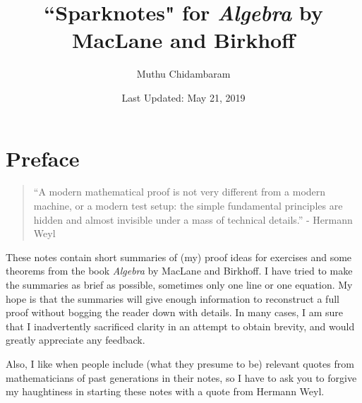 \documentclass{article}
\begin{document}
\title{``Sparknotes" for \textit{Algebra} by MacLane and Birkhoff}
\author{Muthu Chidambaram}
\date{Last Updated: May 21, 2019}

\maketitle

\tableofcontents
\newpage 

\section*{Preface}

\begin{framed}
\begin{quote}
``A modern mathematical proof is not very different from a modern machine, or a modern test setup: the simple fundamental principles are hidden and almost invisible under a mass of technical details.'' - Hermann Weyl
\end{quote}
\end{framed}

These notes contain short summaries of (my) proof ideas for exercises
and some theorems from the book \textit{Algebra} by MacLane and Birkhoff.
I have tried to make the summaries as brief as possible, sometimes only one line or one equation.
My hope is that the summaries will give enough information to reconstruct a full proof without bogging the reader down with details. 
In many cases, I am sure that I inadvertently sacrificed clarity in an attempt to obtain brevity, and would greatly appreciate any feedback.

Also, I like when people include (what they presume to be) relevant quotes from mathematicians of past generations in their notes, so I have to ask you to forgive my haughtiness in starting these notes with a quote from Hermann Weyl.


\end{document}
